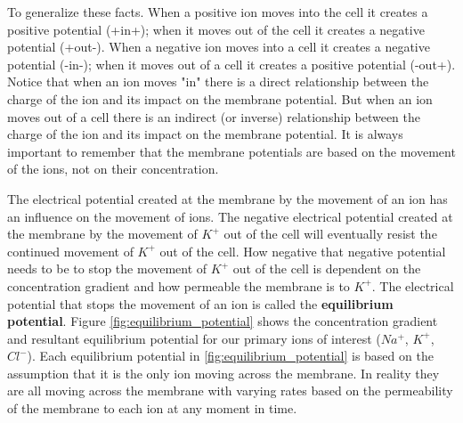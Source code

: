 \begin{svgraybox}
    To generalize these facts. When a positive ion moves into the cell it creates a positive potential (+in+); when it moves out of the cell it creates a negative potential (+out-). When a negative ion moves into a cell it creates a negative potential (-in-); when it moves out of a cell it creates a positive potential (-out+). Notice that when an ion moves "in" there is a direct relationship between the charge of the ion and its impact on the membrane potential. But when an ion moves out of a cell there is an indirect (or inverse) relationship between the charge of the ion and its impact on the membrane potential. It is always important to remember that the membrane potentials are based on the movement of the ions, not on their concentration. 
\end{svgraybox}

The electrical potential created at the membrane by the movement of an ion has an influence on the movement of ions. The negative electrical potential created at the membrane by the movement of $K^+$ out of the cell will eventually resist the continued movement of $K^+$ out of the cell. How negative that negative potential needs to be to stop the movement of $K^+$ out of the cell is dependent on the concentration gradient and how permeable the membrane is to $K^+$.\footnotemark{} The electrical potential that stops the movement of an ion is called the \textbf{equilibrium potential}. Figure \ref{fig:equilibrium_potential} shows the concentration gradient and resultant equilibrium potential for our primary ions of interest ($Na^+$, $K^+$, $Cl^-$). Each equilibrium potential in \ref{fig:equilibrium_potential} is based on the assumption that it is the only ion moving across the membrane. In reality they are all moving across the membrane with varying rates based on the permeability of the membrane to each ion at any moment in time.\footnotemark{}

